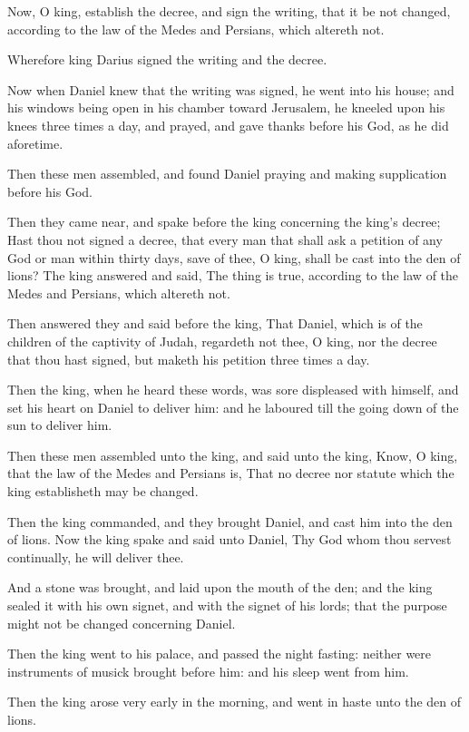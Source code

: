 \verse Now, O king, establish the decree, and sign the writing, that it be not changed, according to the law of the Medes and Persians, which altereth not.

\verse Wherefore king Darius signed the writing and the decree.

\verse Now when Daniel knew that the writing was signed, he went into his house; and his windows being open in his chamber toward Jerusalem, he kneeled upon his knees three times a day, and prayed, and gave thanks before his God, as he did aforetime.

\verse Then these men assembled, and found Daniel praying and making supplication before his God.

\verse Then they came near, and spake before the king concerning the king's decree; Hast thou not signed a decree, that every man that shall ask a petition of any God or man within thirty days, save of thee, O king, shall be cast into the den of lions? The king answered and said, The thing is true, according to the law of the Medes and Persians, which altereth not.

\verse Then answered they and said before the king, That Daniel, which is of the children of the captivity of Judah, regardeth not thee, O king, nor the decree that thou hast signed, but maketh his petition three times a day.

\verse Then the king, when he heard these words, was sore displeased with himself, and set his heart on Daniel to deliver him: and he laboured till the going down of the sun to deliver him.

\verse Then these men assembled unto the king, and said unto the king, Know, O king, that the law of the Medes and Persians is, That no decree nor statute which the king establisheth may be changed.

\verse Then the king commanded, and they brought Daniel, and cast him into the den of lions. Now the king spake and said unto Daniel, Thy God whom thou servest continually, he will deliver thee.

\verse And a stone was brought, and laid upon the mouth of the den; and the king sealed it with his own signet, and with the signet of his lords; that the purpose might not be changed concerning Daniel.

\verse Then the king went to his palace, and passed the night fasting: neither were instruments of musick brought before him: and his sleep went from him.

\verse Then the king arose very early in the morning, and went in haste unto the den of lions.

